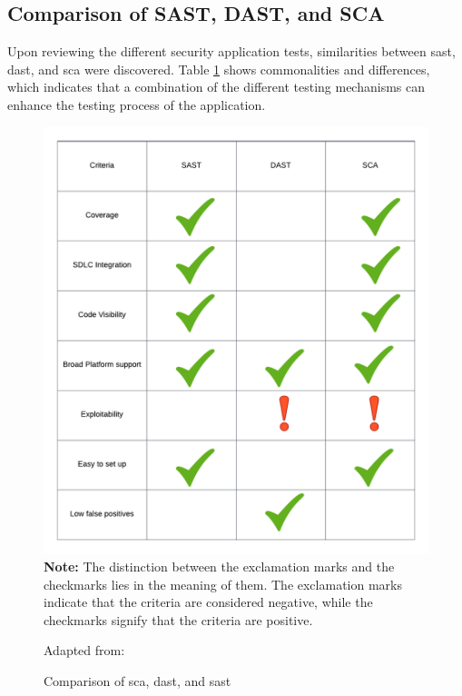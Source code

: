 \newpage
\subsection{Comparison of SAST, DAST, and SCA}
Upon reviewing the different security application tests, similarities between \acrshort{sast}, \acrshort{dast}, and \acrshort{sca} were discovered. Table \ref{fig: Comparison of SCA, DAST, and SASt} shows commonalities and differences, which indicates that a combination of the different testing mechanisms can enhance the testing process of the application. 

\vspace{2mm}
\begin{figure}[H]
    \centering
    \includegraphics[width=0.8\columnwidth]{Images/Blank diagram - Page 1.png}\\
    \textbf{Note:} The distinction between the exclamation marks and the checkmarks lies in the meaning of them. The exclamation marks indicate that the criteria are considered negative, while the checkmarks signify that the criteria are positive.
    \caption{Comparison of \acrshort{sca}, \acrshort{dast}, and \acrshort{sast} }Adapted from: \cite{Comparison}
    \label{fig: Comparison of SCA, DAST, and SASt}
\end{figure}
\newpage
